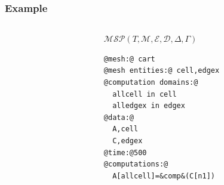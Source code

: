 \documentclass{beamer}
\begin{document}
\begin{frame}[fragile]
\frametitle{Example}
\begin{columns}
\begin{column}{.52\textwidth}
\hspace{10pt}
\end{column}
\begin{column}{.48\textwidth}
$\mathcal{MSP}(T,\mathcal{M},\mathcal{E},\mathcal{D},\Delta,\Gamma)$\\

\begin{lstlisting}[style=base]
@mesh:@ cart
@mesh entities:@ cell,edgex
@computation domains:@
  allcell in cell
  alledgex in edgex
@data:@
  A,cell
  C,edgex
@time:@500
@computations:@
  A[allcell]=&comp&(C[n1])
\end{lstlisting}
\end{column}
\end{columns}
\end{frame}
\end{document}
